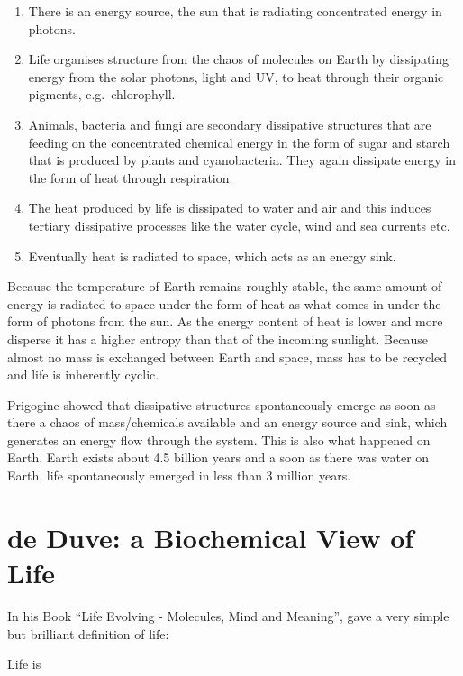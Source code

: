 \documentclass[
  11pt,
]{book}
\begin{document}
\begin{enumerate}
\def\labelenumi{\arabic{enumi}.}
\item
  There is an energy source, the sun that is radiating concentrated energy in photons.
\item
  Life organises structure from the chaos of molecules on Earth by dissipating energy from the solar photons, light and UV, to heat through their organic pigments, e.g.~chlorophyll.
\item
  Animals, bacteria and fungi are secondary dissipative structures that are feeding on the concentrated chemical energy in the form of sugar and starch that is produced by plants and cyanobacteria. They again dissipate energy in the form of heat through respiration.
\item
  The heat produced by life is dissipated to water and air and this induces tertiary dissipative processes like the water cycle, wind and sea currents etc.
\item
  Eventually heat is radiated to space, which acts as an energy sink.
\end{enumerate}

Because the temperature of Earth remains roughly stable, the same amount of energy is radiated to space under the form of heat as what comes in under the form of photons from the sun. As the energy content of heat is lower and more disperse it has a higher entropy than that of the incoming sunlight.
Because almost no mass is exchanged between Earth and space, mass has to be recycled and life is inherently cyclic.

Prigogine showed that dissipative structures spontaneously emerge as soon as there a chaos of mass/chemicals available and an energy source and sink, which generates an energy flow through the system.
This is also what happened on Earth. Earth exists about 4.5 billion years and a soon as there was water on Earth, life spontaneously emerged in less than 3 million years.

\hypertarget{de-duve-a-biochemical-view-of-life}{%
\section{de Duve: a Biochemical View of Life}\label{de-duve-a-biochemical-view-of-life}}

In his Book ``Life Evolving - Molecules, Mind and Meaning'', \citet{deDuve2002} gave a very simple but brilliant definition of life:

Life is
\end{document}
